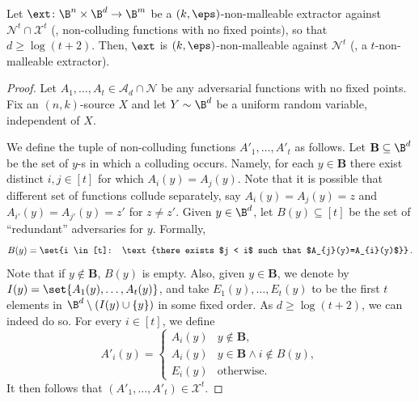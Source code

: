 \documentclass{toc}
\begin{document}
\begin{lemma}\label{lem:nm-with-coll} 
Let $\ext \colon \B^{n} \times \B^{d} \rightarrow \B^{m}$ be a $(k,\eps)$-non-malleable
extractor against $\mathcal{N}^{t} \cap \mathcal{X}^{t}$ (\ie, non-colluding functions
with no fixed points), so that $d \ge \log (t + 2)$. Then, $\ext$ is $(k,\eps)$-non-malleable
against $\mathcal{N}^{t}$ (\ie, a $t$-non-malleable extractor).
\end{lemma}
\begin{proof}
Let $A_1,\ldots,A_t \in \mathcal{A}_d \cap \mathcal{N}$ be any adversarial
functions with no fixed points. 
Fix an $(n,k)$-source $X$ and let $Y \sim \B^d$ be a uniform random variable,
independent of $X$.

We define the tuple of non-colluding functions
$A'_1,\ldots,A'_t$ as follows. Let $\mathbf{B} \subseteq \B^d$ be the set of $y$-s 
in which a colluding occurs. Namely, for each $y \in \mathbf{B}$ there exist distinct $i,j \in [t]$
for which $A_{i}(y)=A_{j}(y)$. Note that it is possible that different set of functions collude
separately, say $A_{i}(y)=A_{j}(y) = z$ and $A_{i'}(y)=A_{j'}(y) = z'$ for $z \neq z'$.
Given $y \in \B^d$, let $B(y) \subseteq [t]$ be the set of ``redundant'' 
adversaries for $y$. Formally, 
\[
B(y) = \set{i \in [t]: \text{there exists $j < i$ such that $A_{j}(y)=A_{i}(y)$}}\,.
\]
Note that if $y \notin \mathbf{B}$, $B(y)$ is empty. 
Also, given $y \in \mathbf{B}$, we denote by $I(y) = \set{A_{1}(y),\ldots,A_{t}(y)}$, and
take $E_1(y),\ldots,E_{t}(y)$ to be the first $t$ elements in $\B^{d} \setminus (I(y) \cup \{y\})$ in some fixed order.  
As $d \ge \log( t + 2)$, we can indeed do so. For every $i \in [t]$, we define
\[
A'_{i}(y) = 
\begin{cases}
A_{i}(y) & y \notin \mathbf{B}, \\
A_{i}(y) & y \in \mathbf{B} \wedge i \notin B(y), \\
E_{i}(y) & \text{otherwise}.
\end{cases}
\]
It then follows that $\left( A'_1,\ldots,A'_t \right) \in \mathcal{X}^t$. 


\end{proof}
\end{document}
